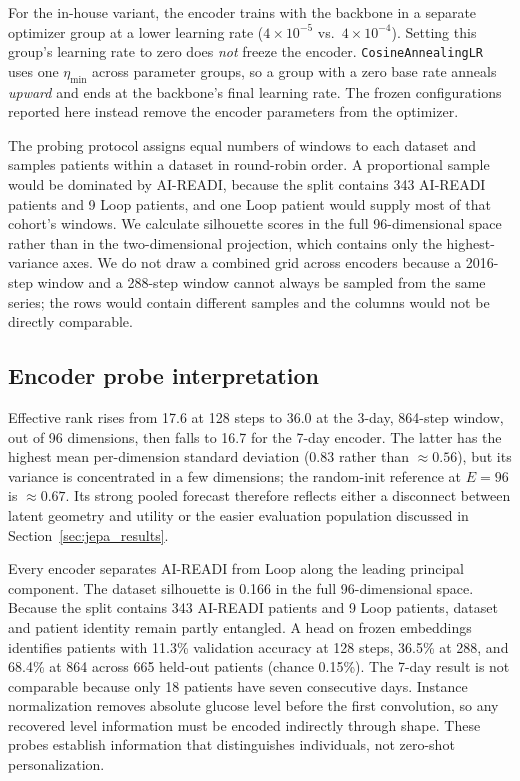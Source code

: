\documentclass[11pt,a4paper]{article}
\begin{document}
For the in-house variant, the encoder trains with the backbone in a separate optimizer group at a lower learning rate ($4 \times 10^{-5}$ vs.\ $4 \times 10^{-4}$).
Setting this group's learning rate to zero does \emph{not} freeze the encoder.
\texttt{CosineAnnealingLR} uses one $\eta_\text{min}$ across parameter groups, so a group with a zero base rate anneals \emph{upward} and ends at the backbone's final learning rate.
The frozen configurations reported here instead remove the encoder parameters from the optimizer.

The probing protocol assigns equal numbers of windows to each dataset and samples patients within a dataset in round-robin order.
A proportional sample would be dominated by AI-READI, because the split contains 343 AI-READI patients and 9 Loop patients, and one Loop patient would supply most of that cohort's windows.
We calculate silhouette scores in the full 96-dimensional space rather than in the two-dimensional projection, which contains only the highest-variance axes.
We do not draw a combined grid across encoders because a 2016-step window and a 288-step window cannot always be sampled from the same series; the rows would contain different samples and the columns would not be directly comparable.

\subsection{Encoder probe interpretation}

Effective rank rises from 17.6 at 128 steps to 36.0 at the 3-day, 864-step window, out of 96 dimensions, then falls to 16.7 for the 7-day encoder.
The latter has the highest mean per-dimension standard deviation (0.83 rather than $\approx0.56$), but its variance is concentrated in a few dimensions; the random-init reference at $E=96$ is $\approx0.67$.
Its strong pooled forecast therefore reflects either a disconnect between latent geometry and utility or the easier evaluation population discussed in Section~\ref{sec:jepa_results}.

Every encoder separates AI-READI from Loop along the leading principal component.
The dataset silhouette is 0.166 in the full 96-dimensional space.
Because the split contains 343 AI-READI patients and 9 Loop patients, dataset and patient identity remain partly entangled.
A head on frozen embeddings identifies patients with 11.3\% validation accuracy at 128 steps, 36.5\% at 288, and 68.4\% at 864 across 665 held-out patients (chance 0.15\%).
The 7-day result is not comparable because only 18 patients have seven consecutive days.
Instance normalization removes absolute glucose level before the first convolution, so any recovered level information must be encoded indirectly through shape.
These probes establish information that distinguishes individuals, not zero-shot personalization.
\end{document}
